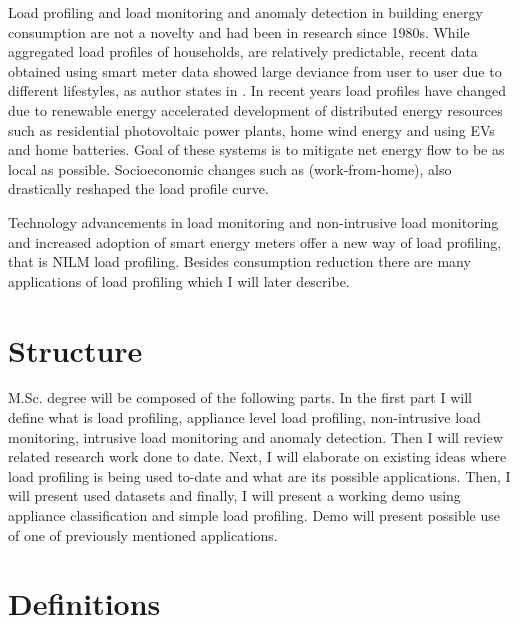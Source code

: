 \documentclass[
11pt, %
english, %
singlespacing, %
headsepline, %
]{MastersDoctoralThesis} %
\begin{document}
Load profiling and load monitoring and anomaly detection in building energy consumption are not a novelty and had been in research since 1980s. While aggregated load profiles of households, 
are relatively predictable, recent data obtained using smart meter data showed large deviance from user to user due to different lifestyles,
as author states in \cite{Review2021}. In recent years load profiles have changed due to renewable energy accelerated development of distributed energy resources such as residential photovoltaic
power plants, home wind energy and using EVs and home batteries. Goal of these systems is to mitigate net energy flow to be as local as possible. Socioeconomic changes such as (work-from-home),
also drastically reshaped the load profile curve. 



Technology advancements in load monitoring and non-intrusive load monitoring and increased adoption of smart energy meters offer a new
way of load profiling, that is NILM load profiling. Besides consumption reduction there are many applications of load profiling which I will later describe.

\section{Structure}
M.Sc. degree will be composed of the following parts. In the first part I will define what is load profiling, appliance level load profiling, 
non-intrusive load monitoring, intrusive load monitoring and anomaly detection. Then I will review related research work done to date. Next, I will elaborate 
on existing ideas where load profiling is being used to-date and what are its possible applications. Then, I will present used datasets and finally,
I will present a working demo using appliance classification and simple load profiling.
Demo will present possible use of one of previously mentioned applications. 

\section{Definitions}
\end{document}
